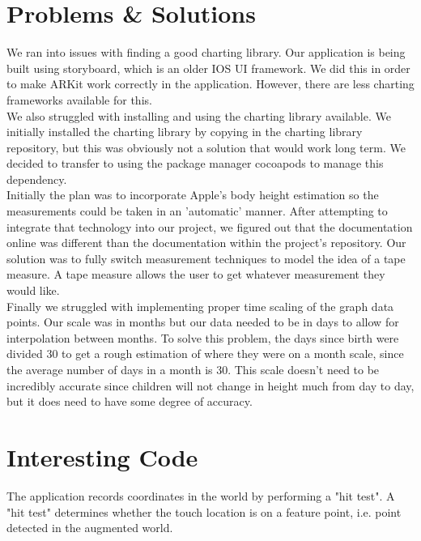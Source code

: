 \documentclass[onecolumn, draftclsnofoot,10pt, compsoc]{IEEEtran}
\begin{document}
\section{Problems & Solutions}

We ran into issues with finding a good charting library. Our application is being built using storyboard, which is an older IOS UI framework. We did this in order to make ARKit work correctly in the application. However, there are less charting frameworks available for this.\\

We also struggled with installing and using the charting library available. We initially installed the charting library by copying in the charting library repository, but this was obviously not a solution that would work long term. We decided to transfer to using the package manager cocoapods to manage this dependency.\\

Initially the plan was to incorporate Apple's body height estimation so the measurements could be taken in an 'automatic' manner. After attempting to integrate that technology into our project, we figured out that the documentation online was different than the documentation within the project's repository. Our solution was to fully switch measurement techniques to model the idea of a tape measure. A tape measure allows the user to get whatever measurement they would like.\\

Finally we struggled with implementing proper time scaling of the graph data points. Our scale was in months but our data needed to be in days to allow for interpolation between months. To solve this problem, the days since birth were divided 30 to get a rough estimation of where they were on a month scale, since the average number of days in a month is 30. This scale doesn't need to be incredibly accurate since children will not change in height much from day to day, but it does need to have some degree of accuracy.


\section{Interesting Code}

The application records coordinates in the world by performing a "hit test". A "hit test" determines whether the touch location is on a feature point, i.e. point detected in the augmented world.
\end{document}
